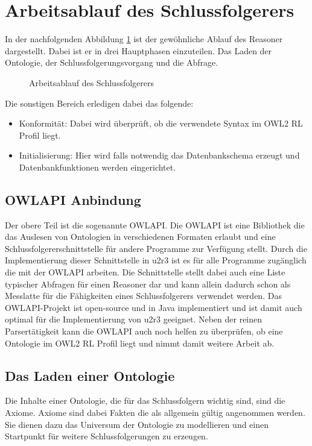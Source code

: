 \section{Arbeitsablauf des Schlussfolgerers}

In der nachfolgenden Abbildung \ref{image-u2r3-workflow} ist der gewöhnliche Ablauf des Reasoner dargestellt. Dabei ist er in drei Hauptphasen einzuteilen. Das Laden der Ontologie, der Schlussfolgerungsvorgang und die Abfrage.

\begin{figure}[htp]
	\caption{Arbeitsablauf des Schlussfolgerers}
	\label{image-u2r3-workflow}
\begin{center}
\end{center}
\end{figure}

Die sonstigen Bereich erledigen dabei das folgende:
\begin{itemize}
  \item Konformität: Dabei wird überprüft, ob die verwendete Syntax im OWL2 RL Profil liegt.
  \item Initialisierung: Hier wird falls notwendig das Datenbankschema erzeugt und Datenbankfunktionen werden eingerichtet.
\end{itemize}


\subsection{OWLAPI Anbindung}

Der obere Teil ist die sogenannte OWLAPI. Die OWLAPI ist eine Bibliothek die das Auslesen von Ontologien in verschiedenen Formaten erlaubt und eine Schlussfolgererschnittstelle für andere Programme zur Verfügung stellt. Durch die Implementierung dieser Schnittstelle in u2r3 ist es für alle Programme zugänglich die mit der OWLAPI arbeiten.
Die Schnittstelle stellt dabei auch eine Liste typischer Abfragen für einen Reasoner dar und kann allein dadurch schon als Messlatte für die Fähigkeiten eines Schlussfolgerers verwendet werden. Das OWLAPI-Projekt ist open-source und in Java implementiert und ist damit auch optimal für die Implementierung von u2r3 geeignet. Neben der reinen Parsertätigkeit kann die OWLAPI auch noch helfen zu überprüfen, ob eine Ontologie im OWL2 RL Profil liegt und nimmt damit weitere Arbeit ab.

\subsection{Das Laden einer Ontologie}
\label{abschnitt-laden-einer-ontologie}
Die Inhalte einer Ontologie, die für das Schlussfolgern wichtig sind, sind die Axiome. Axiome sind dabei Fakten die als allgemein gültig angenommen werden. Sie dienen dazu das Universum der Ontologie zu modellieren und einen Startpunkt für weitere Schlussfolgerungen zu erzeugen.

